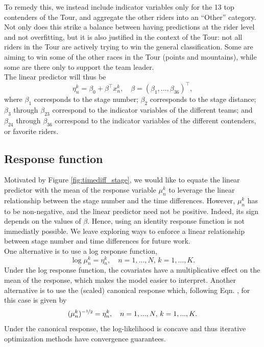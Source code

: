 \documentclass[aos,preprint]{imsart}
\begin{document}
To remedy this, we instead include indicator variables only for the 13 top contenders of the Tour, and aggregate the other riders into an ``Other'' category. Not only does this strike a balance between having predictions at the rider level and not overfitting, but it is also justified in the context of the Tour: not all riders in the Tour are actively trying to win the general classification. Some are aiming to win some of the other races in the Tour (points and mountains), while some are there only to support the team leader. \\

The linear predictor will thus be
\[
  \eta_n^k = \beta_0 + \beta^\top x_n^k, \quad \beta = (\beta_1, ..., \beta_{36})^\top,
\]
where $\beta_1$ corresponds to the stage number; $\beta_2$ corresponds to the stage distance; $\beta_3$ through $\beta_{23}$ correspond to the indicator variables of the different teams; and $\beta_{24}$ through $\beta_{36}$ correspond to the indicator variables of the different contenders, or favorite riders.




\subsection{Response function}



Motivated by Figure \ref{fig:timediff_stage}, we would like to equate the linear predictor with the mean of the response variable $\mu_n^k$ to leverage the linear relationship between the stage number and the time differences. However, $\mu_n^k$ has to be non-negative, and the linear predictor need not be positive. Indeed, its sign depends on the values of $\beta$. Hence, using an identity response function is not immediatly possible. We leave exploring ways to enforce a linear relationship between stage number and time differences for future work. \\

One alternative is to use a log response function,
\[
  \log \mu_n^k = \eta_n^k, \quad n = 1, ..., N, \, k = 1, ..., K. \label{eq:log-response}
\]
Under the log response function, the covariates have a multiplicative effect on the mean of the response, which makes the model easier to interpret. Another alternative is to use the (scaled) canonical response which, following Eqn. , for this case is given by
\[
  (\mu_n^k)^{-\nicefrac{1}{2}} = \eta_n^k, \quad n = 1, ..., N, \, k = 1, ..., K. \label{eq:canonical-response}
\]
Under the canonical response, the log-likelihood is concave and thus iterative optimization methods have convergence guarantees.
\end{document}
